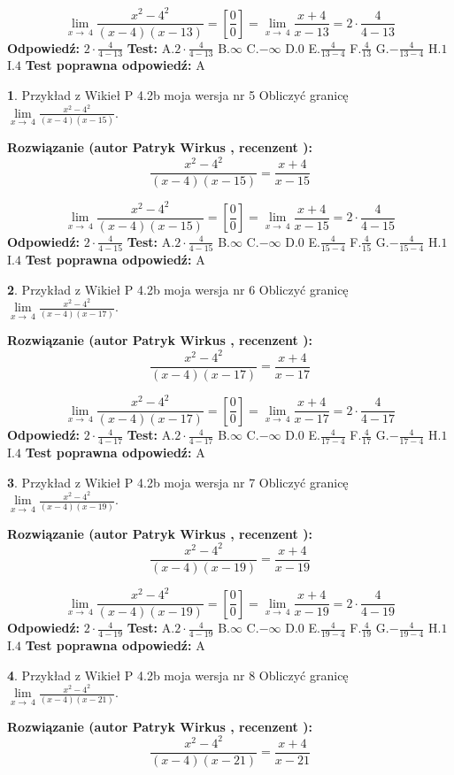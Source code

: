 \documentclass[12pt, a4paper]{article}
\theoremstyle{definition} %
\newtheorem{zad}{}
\newcommand{\zadStart}[1]{\begin{zad}#1\newline}
\newcommand{\zadStop}{\end{zad}}
\newcommand{\rozwStart}[2]{\noindent \textbf{Rozwiązanie (autor #1 , recenzent #2): }\newline}
\newcommand{\rozwStop}{\newline}
\newcommand{\odpStart}{\noindent \textbf{Odpowiedź:}\newline}
\newcommand{\odpStop}{\newline}
\newcommand{\testStart}{\noindent \textbf{Test:}\newline}
\newcommand{\testStop}{\newline}
\newcommand{\kluczStart}{\noindent \textbf{Test poprawna odpowiedź:}\newline}
\newcommand{\kluczStop}{\newline}
\begin{document}
$$\lim\limits_{x\to\ 4}\frac{x^{2}-4^{2}}{(x-4)(x-13)}=[\frac{0}{0}]=\lim\limits_{x\to\ 4}\frac{x+4}{x-13}=2 \cdot \frac{4}{4-13}$$
\rozwStop
\odpStart
$2 \cdot \frac{4}{4-13}$
\odpStop
\testStart
A.$2 \cdot \frac{4}{4-13}$
B.$\infty$
C.$-\infty$
D.$0$
E.$\frac{4}{13-4}$
F.$\frac{4}{13}$
G.$-\frac{4}{13-4}$
H.$1$
I.$4$
\testStop
\kluczStart
A
\kluczStop



\zadStart{Przykład z Wikieł P 4.2b moja wersja nr 5}
Obliczyć granicę $\lim\limits_{x\to\ 4}\frac{x^{2}-4^{2}}{(x-4)(x-15)}$.
\zadStop
\rozwStart{Patryk Wirkus}{}
$$\frac{x^{2}-4^{2}}{(x-4)(x-15)}=\frac{x+4}{x-15}$$

$$\lim\limits_{x\to\ 4}\frac{x^{2}-4^{2}}{(x-4)(x-15)}=[\frac{0}{0}]=\lim\limits_{x\to\ 4}\frac{x+4}{x-15}=2 \cdot \frac{4}{4-15}$$
\rozwStop
\odpStart
$2 \cdot \frac{4}{4-15}$
\odpStop
\testStart
A.$2 \cdot \frac{4}{4-15}$
B.$\infty$
C.$-\infty$
D.$0$
E.$\frac{4}{15-4}$
F.$\frac{4}{15}$
G.$-\frac{4}{15-4}$
H.$1$
I.$4$
\testStop
\kluczStart
A
\kluczStop



\zadStart{Przykład z Wikieł P 4.2b moja wersja nr 6}
Obliczyć granicę $\lim\limits_{x\to\ 4}\frac{x^{2}-4^{2}}{(x-4)(x-17)}$.
\zadStop
\rozwStart{Patryk Wirkus}{}
$$\frac{x^{2}-4^{2}}{(x-4)(x-17)}=\frac{x+4}{x-17}$$

$$\lim\limits_{x\to\ 4}\frac{x^{2}-4^{2}}{(x-4)(x-17)}=[\frac{0}{0}]=\lim\limits_{x\to\ 4}\frac{x+4}{x-17}=2 \cdot \frac{4}{4-17}$$
\rozwStop
\odpStart
$2 \cdot \frac{4}{4-17}$
\odpStop
\testStart
A.$2 \cdot \frac{4}{4-17}$
B.$\infty$
C.$-\infty$
D.$0$
E.$\frac{4}{17-4}$
F.$\frac{4}{17}$
G.$-\frac{4}{17-4}$
H.$1$
I.$4$
\testStop
\kluczStart
A
\kluczStop



\zadStart{Przykład z Wikieł P 4.2b moja wersja nr 7}
Obliczyć granicę $\lim\limits_{x\to\ 4}\frac{x^{2}-4^{2}}{(x-4)(x-19)}$.
\zadStop
\rozwStart{Patryk Wirkus}{}
$$\frac{x^{2}-4^{2}}{(x-4)(x-19)}=\frac{x+4}{x-19}$$

$$\lim\limits_{x\to\ 4}\frac{x^{2}-4^{2}}{(x-4)(x-19)}=[\frac{0}{0}]=\lim\limits_{x\to\ 4}\frac{x+4}{x-19}=2 \cdot \frac{4}{4-19}$$
\rozwStop
\odpStart
$2 \cdot \frac{4}{4-19}$
\odpStop
\testStart
A.$2 \cdot \frac{4}{4-19}$
B.$\infty$
C.$-\infty$
D.$0$
E.$\frac{4}{19-4}$
F.$\frac{4}{19}$
G.$-\frac{4}{19-4}$
H.$1$
I.$4$
\testStop
\kluczStart
A
\kluczStop



\zadStart{Przykład z Wikieł P 4.2b moja wersja nr 8}
Obliczyć granicę $\lim\limits_{x\to\ 4}\frac{x^{2}-4^{2}}{(x-4)(x-21)}$.
\zadStop
\rozwStart{Patryk Wirkus}{}
$$\frac{x^{2}-4^{2}}{(x-4)(x-21)}=\frac{x+4}{x-21}$$
\end{document}
